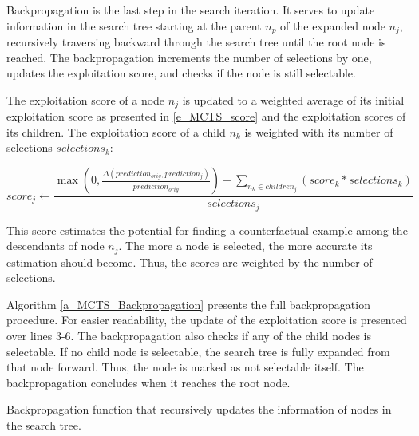 Backpropagation is the last step in the search iteration. It serves to update information in the search tree starting at the parent $n_p$ of the expanded node $n_j$, recursively traversing backward through the search tree until the root node is reached. The backpropagation increments the number of selections by one, updates the exploitation score, and checks if the node is still selectable.

The exploitation score of a node $n_j$ is updated to a weighted average of its initial exploitation score as presented in \ref{e_MCTS_score} and the exploitation scores of its children. The exploitation score of a child $n_k$ is weighted with its number of selections $selections_k$:

\begin{equation}
    score_j \gets \frac{
        \max\left(0, \frac{\Delta(prediction_{orig}, prediction_j)}{|prediction_{orig}|}\right) + \sum_{n_k \in children_j} (score_k * selections_k)
    }{
        selections_j
    }
\end{equation}

This score estimates the potential for finding a counterfactual example among the descendants of node $n_j$. The more a node is selected, the more accurate its estimation should become. Thus, the scores are weighted by the number of selections. 

Algorithm \ref{a_MCTS_Backpropagation} presents the full backpropagation procedure. For easier readability, the update of the exploitation score is presented over lines 3-6. The backpropagation also checks if any of the child nodes is selectable. If no child node is selectable, the search tree is fully expanded from that node forward. Thus, the node is marked as not selectable itself. The backpropagation concludes when it reaches the root node.

{
\setlength{\algomargin}{1.25em}
\small
\begin{algorithm}[ht]
\caption{Backpropagation function that recursively updates the information of nodes in the search tree.}
\label{a_MCTS_Backpropagation}
\end{algorithm}
}



